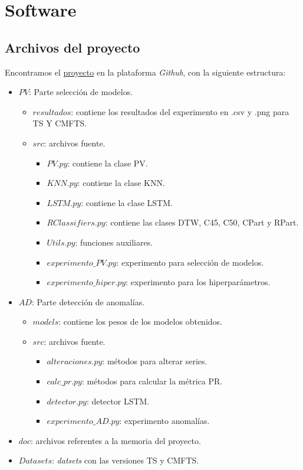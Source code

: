 
\chapter{Software}\label{ap:software}

\section{Archivos del proyecto}

Encontramos el \href{https://github.com/MiguelLentisco/tfg}{proyecto} en la plataforma \emph{Github}, con la siguiente estructura:

\begin{itemize}
  \item $PV$: Parte selección de modelos.
    \begin{itemize}
      \item $resultados$: contiene los resultados del experimento en .csv y .png para TS Y CMFTS.
      \item $src$: archivos fuente.
      \begin{itemize}
        \item $PV.py$: contiene la clase PV.
        \item $KNN.py$: contiene la clase KNN.
        \item $LSTM.py$: contiene la clase LSTM.
        \item $RClassifiers.py$: contiene las clases DTW, C45, C50, CPart y RPart.
        \item $Utils.py$: funciones auxiliares.
        \item $experimento\_PV.py$: experimento para selección de modelos.
        \item $experimento\_hiper.py$: experimento para los hiperparámetros.
      \end{itemize}
    \end{itemize}
  \item $AD$: Parte detección de anomalías.
    \begin{itemize}
      \item $models$: contiene los pesos de los modelos obtenidos.
      \item $src$: archivos fuente.
        \begin{itemize}
          \item $alteraciones.py$: métodos para alterar series.
          \item $calc\_pr.py$: métodos para calcular la métrica PR.
          \item $detector.py$: detector LSTM.
          \item $experimento\_AD.py$: experimento anomalías.
        \end{itemize}
    \end{itemize}
  \item $doc$: archivos referentes a la memoria del proyecto.
  \item $Datasets$: \emph{datsets} con las versiones TS y CMFTS.

\end{itemize}


